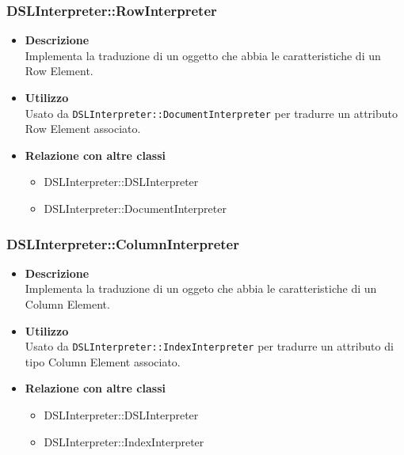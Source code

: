 \subsubsection{DSLInterpreter::RowInterpreter}
\begin{itemize}
\item \textbf{Descrizione} \hfill \\
Implementa la traduzione di un oggetto che abbia le caratteristiche di un Row Element.
\item \textbf{Utilizzo} \hfill \\
Usato da \texttt{DSLInterpreter::DocumentInterpreter} per tradurre un attributo Row Element associato.
\item \textbf{Relazione con altre classi}  
\begin{itemize}
\item DSLInterpreter::DSLInterpreter
\item DSLInterpreter::DocumentInterpreter
\end{itemize}
\end{itemize}

\subsubsection{DSLInterpreter::ColumnInterpreter}
\begin{itemize}
\item \textbf{Descrizione} \hfill \\
Implementa la traduzione di un oggeto che abbia le caratteristiche di un Column Element.
\item \textbf{Utilizzo} \hfill \\
Usato da \texttt{DSLInterpreter::IndexInterpreter} per tradurre un attributo di tipo Column Element associato.
\item \textbf{Relazione con altre classi}
\begin{itemize}
\item DSLInterpreter::DSLInterpreter
\item DSLInterpreter::IndexInterpreter
\end{itemize}
\end{itemize}

